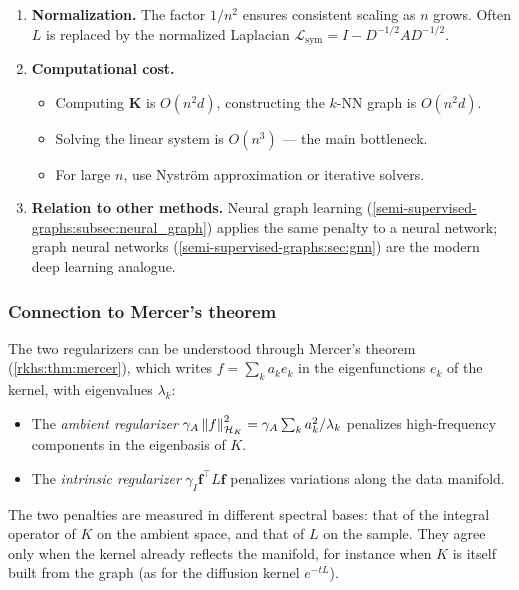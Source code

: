 \begin{notechapter}
\begin{enumerate}[label=\emph{\arabic*.}]
  \item \textbf{Normalization.} The factor $1/n^2$ ensures consistent
    scaling as $n$ grows. Often $L$ is replaced by the normalized
    Laplacian $\mathcal L_{\mathrm{sym}} = I - D^{-1/2}AD^{-1/2}$.

  \item \textbf{Computational cost.}
  \begin{itemize}
    \item Computing $\mathbf{K}$ is $O(n^2 d)$, constructing the $k$-NN graph
      is $O(n^2 d)$.
    \item Solving the linear system is $O(n^3)$ --- the main bottleneck.
    \item For large $n$, use Nystr\"om approximation or iterative solvers.
  \end{itemize}

  \item \textbf{Relation to other methods.} Neural graph learning
    (\cref{semi-supervised-graphs:subsec:neural_graph}) applies the same penalty
    to a neural network; graph neural networks (\cref{semi-supervised-graphs:sec:gnn})
    are the modern deep learning analogue.
\end{enumerate}

\subsubsection*{Connection to Mercer's theorem}

The two regularizers can be understood through Mercer's theorem (\cref{rkhs:thm:mercer}), which writes $f = \sum_k a_k e_k$ in the eigenfunctions $e_k$ of the kernel, with eigenvalues $\lambda_k$:

\begin{itemize}
  \item The \emph{ambient regularizer} $\gamma_A \left\|f\right\|_{\mathcal{H}_K}^2
    = \gamma_A \sum_k a_k^2/\lambda_k$ penalizes high-frequency
    components in the eigenbasis of $K$.
  \item The \emph{intrinsic regularizer} $\gamma_I \mathbf{f}^\top
    L \mathbf{f}$ penalizes variations along the data manifold.
\end{itemize}

The two penalties are measured in different spectral bases: that of the integral operator of $K$ on the ambient space, and that of $L$ on the sample. They agree only when the kernel already reflects the manifold, for instance when $K$ is itself built from the graph (as for the diffusion kernel $e^{-tL}$).


\end{notechapter}
